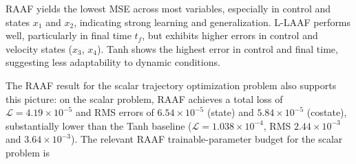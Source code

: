 \documentclass[
  number,
  preprint]{elsarticle}
\begin{document}
RAAF yields the lowest MSE across most variables, especially in control
and states \(x_1\) and \(x_2\), indicating strong learning and
generalization. L-LAAF performs well, particularly in final time
\(t_f\), but exhibits higher errors in control and velocity states
(\(x_3\), \(x_4\)). Tanh shows the highest error in control and final
time, suggesting less adaptability to dynamic conditions.

The RAAF result for the scalar trajectory optimization problem also
supports this picture: on the scalar problem, RAAF achieves a total loss
of \(\mathcal{L} = 4.19 \times 10^{-5}\) and RMS errors of
\(6.54 \times 10^{-5}\) (state) and \(5.84 \times 10^{-5}\) (costate),
substantially lower than the Tanh baseline
(\(\mathcal{L} = 1.038 \times 10^{-4}\), RMS \(2.44 \times 10^{-3}\) and
\(3.64 \times 10^{-3}\)). The relevant RAAF trainable-parameter budget
for the scalar problem is
\end{document}
